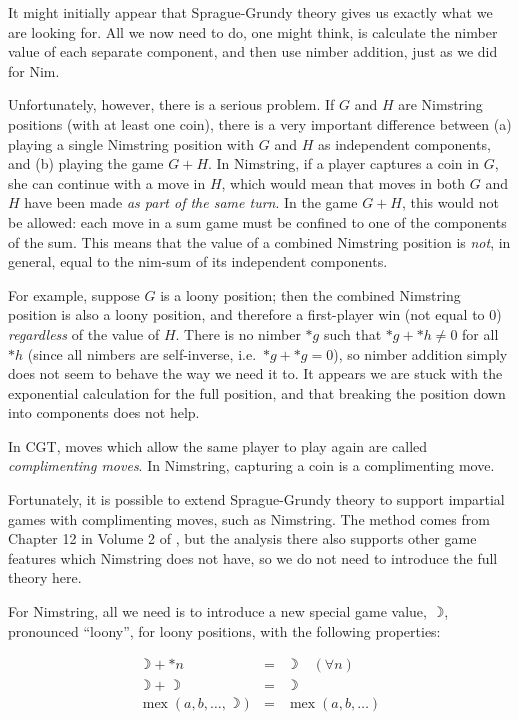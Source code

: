 \documentclass[a4paper,twocolumn]{article}
\DeclareMathOperator{\mex}{mex}
\newcommand{\loony}{\rightmoon}
\begin{document}
It might initially appear that Sprague-Grundy theory gives us exactly
what we are looking for. All we now need to do, one might think, is
calculate the nimber value of each separate component, and then use
nimber addition, just as we did for Nim.

Unfortunately, however, there is a serious problem. If $G$ and $H$ are
Nimstring positions (with at least one coin), there is a very
important difference between (a) playing a single Nimstring position
with $G$ and $H$ as independent components, and (b) playing the game
$G+H$. In Nimstring, if a player captures a coin in $G$, she can
continue with a move in $H$, which would mean that moves in both $G$
and $H$ have been made \emph{as part of the same turn}. In the game
$G+H$, this would not be allowed: each move in a sum game must be
confined to one of the components of the sum. This means that the
value of a combined Nimstring position is \emph{not}, in general,
equal to the nim-sum of its independent components.

For example, suppose $G$ is a loony position; then the combined
Nimstring position is also a loony position, and therefore a
first-player win (not equal to $0$) \emph{regardless} of the value of
$H$. There is no nimber $*g$ such that $*g + *h \neq 0$ for all $*h$
(since all nimbers are self-inverse, i.e.\ $*g + *g = 0$), so nimber
addition simply does not seem to behave the way we need it to. It
appears we are stuck with the exponential calculation for the full
position, and that breaking the position down into components does not
help.

In CGT, moves which allow the same player to play again are called
\emph{complimenting moves}. In Nimstring, capturing a coin is a
complimenting move.

Fortunately, it is possible to extend Sprague-Grundy theory to support
impartial games with complimenting moves, such as Nimstring. The
method comes from Chapter 12 in Volume 2 of \cite{wways}, but the
analysis there also supports other game features which Nimstring does
not have, so we do not need to introduce the full theory here.

For Nimstring, all we need is to introduce a new special game value,
$\loony$, pronounced ``loony'', for loony positions, with the
following properties:

\begin{eqnarray*}
  \loony + *n & = & \loony \quad (\forall n)\\
  \loony + \loony & = & \loony \\
  \mex(a, b, \ldots, \loony) & = & \mex(a, b, \ldots)
\end{eqnarray*}
\end{document}
